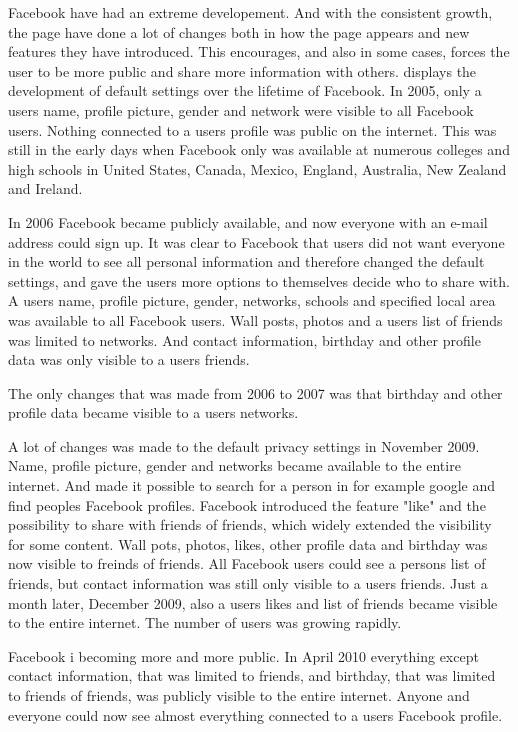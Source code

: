 Facebook have had an extreme developement. And with the consistent growth, the page have done a lot of changes both in how the page appears and new features they have introduced. This encourages, and also in some cases, forces the user to be more public and share more information with others.  displays the development of default settings over the lifetime of Facebook. In 2005, only a users name, profile picture, gender and network were visible to all Facebook users. Nothing connected to a users profile was public on the internet. This was still in the early days when Facebook only was available at numerous colleges and high schools in United States, Canada, Mexico, England, Australia, New Zealand and Ireland.

In 2006 Facebook became publicly available, and now everyone with an e-mail address could sign up. It was clear to Facebook that users did not want everyone in the world to see all personal information and therefore changed the default settings, and gave the users more options to themselves decide who to share with. A users name, profile picture, gender, networks, schools and specified local area was available to all Facebook users. Wall posts, photos and a users list of friends was limited to networks. And contact information, birthday and other profile data was only visible to a users friends. 

The only changes that was made from 2006 to 2007 was that birthday and other profile data became visible to a users networks.

A lot of changes was made to the default privacy settings in November 2009. Name, profile picture, gender and networks became available to the entire internet. And made it possible to search for a person in for example google and find peoples Facebook profiles. Facebook introduced the feature "like" and the possibility to share with friends of friends, which widely extended the visibility for some content. Wall pots, photos, likes, other profile data and birthday was now visible to freinds of friends. All Facebook users could see a persons list of friends, but contact information was still only visible to a users friends. Just a month later, December 2009, also a users likes and list of friends became visible to the entire internet. The number of users was growing rapidly.

Facebook i becoming more and more public. In April 2010 everything except contact information, that was limited to friends, and birthday, that was limited to friends of friends, was publicly visible to the entire internet. Anyone and everyone could now see almost everything connected to a users Facebook profile. 

